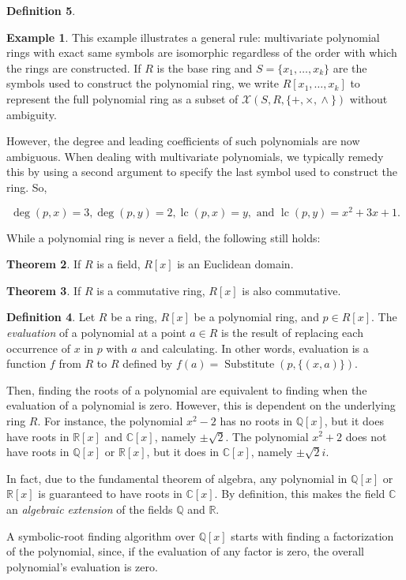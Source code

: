 \documentclass{article}
\theoremstyle{definition}
\newtheorem{thm}{Theorem}[section]
\newtheorem{defin}[thm]{Definition}
\newtheorem{exa}[thm]{Example}
\DeclareMathOperator{\pow}{\wedge}
\DeclareMathOperator{\subs}{Substitute}
\DeclareMathOperator{\lc}{lc}
\begin{document}
\begin{defin}
\begin{exa}
        This example illustrates a general rule: multivariate polynomial rings with exact same symbols are isomorphic regardless of the order with which the rings are constructed. If $R$ is the base ring and $S = \{x_1,\ldots, x_k\}$ are the symbols used to construct the polynomial ring, we write $R[x_1, \ldots, x_k]$ to represent the full polynomial ring as a subset of $\mathcal{X}(S, R, \{+, \times, \pow\})$ without ambiguity.
        
        However, the degree and leading coefficients of such polynomials are now ambiguous. When dealing with multivariate polynomials, we typically remedy this by using a second argument to specify the last symbol used to construct the ring. So,
        
        \[\deg(p, x) = 3, \deg(p, y) = 2, \lc(p, x) = y, \text{ and } \lc(p, y) = x^2+3x+1.\]

    \end{exa}
    
    While a polynomial ring is never a field, the following still holds:
    
    \begin{thm}
        If $R$ is a field, $R[x]$ is an Euclidean domain.
    \end{thm}
    
    \begin{thm}
        If $R$ is a commutative ring, $R[x]$ is also commutative.
    \end{thm}
    
    \begin{defin}
        Let $R$ be a ring, $R[x]$ be a polynomial ring, and $p \in R[x]$. The \emph{evaluation} of a polynomial at a point $a \in R$ is the result of replacing each occurrence of $x$ in $p$ with $a$ and calculating. In other words, evaluation is a function $f$ from $R$ to $R$ defined by $f(a) = \subs(p, \{(x, a)\})$.
    \end{defin}
    
    Then, finding the roots of a polynomial are equivalent to finding when the evaluation of a polynomial is zero. However, this is dependent on the underlying ring $R$. For instance, the polynomial $x^2-2$ has no roots in $\mathbb{Q}[x]$, but it does have roots in $\mathbb{R}[x]$ and $\mathbb{C}[x]$, namely $\pm\sqrt{2}$. The polynomial $x^2+2$ does not have roots in $\mathbb{Q}[x]$ or $\mathbb{R}[x]$, but it does in $\mathbb{C}[x]$, namely $\pm\sqrt{2}i$.
    
    In fact, due to the fundamental theorem of algebra, any polynomial in $\mathbb{Q}[x]$ or $\mathbb{R}[x]$ is guaranteed to have roots in $\mathbb{C}[x]$. By definition, this makes the field $\mathbb{C}$ an \emph{algebraic extension} of the fields $\mathbb{Q}$ and $\mathbb{R}$.
    
    A symbolic-root finding algorithm over $\mathbb{Q}[x]$ starts with finding a factorization of the polynomial, since, if the evaluation of any factor is zero, the overall polynomial's evaluation is zero.
    
\end{defin}
\end{document}
